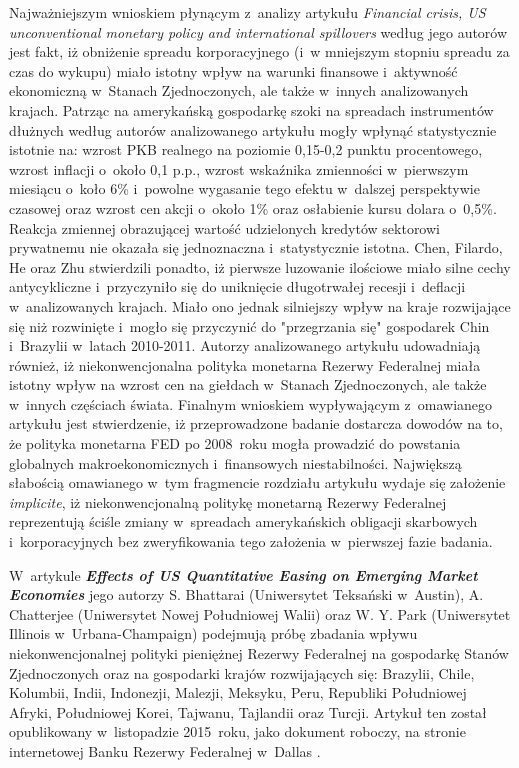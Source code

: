 Najważniejszym wnioskiem płynącym z~analizy artykułu \textit{Financial crisis, US unconventional monetary policy and international spillovers} według jego autorów jest fakt, iż obniżenie spreadu korporacyjnego (i~w mniejszym stopniu spreadu za czas do wykupu) miało istotny wpływ na warunki finansowe i~aktywność ekonomiczną w~Stanach Zjednoczonych, ale także w~innych analizowanych krajach. Patrząc na amerykańską gospodarkę szoki na spreadach instrumentów dłużnych według autorów analizowanego artykułu mogły wpłynąć statystycznie istotnie na: wzrost PKB realnego na poziomie 0,15-0,2 punktu procentowego, wzrost inflacji o~około 0,1 p.p., wzrost wskaźnika zmienności w~pierwszym miesiącu o~koło 6\% i~powolne wygasanie tego efektu w~dalszej perspektywie czasowej oraz wzrost cen akcji o~około 1\% oraz osłabienie kursu dolara o~0,5\%. Reakcja zmiennej obrazującej wartość udzielonych kredytów sektorowi prywatnemu nie okazała się jednoznaczna i~statystycznie istotna. Chen, Filardo, He oraz Zhu stwierdzili ponadto, iż pierwsze luzowanie ilościowe miało silne cechy antycykliczne i~przyczyniło się do uniknięcie długotrwałej recesji i~deflacji w~analizowanych krajach. Miało ono jednak silniejszy wpływ na kraje rozwijające się niż rozwinięte i~mogło się przyczynić do "przegrzania się" gospodarek Chin i~Brazylii w~latach 2010-2011. Autorzy analizowanego artykułu udowadniają również, iż niekonwencjonalna polityka monetarna Rezerwy Federalnej miała istotny wpływ na wzrost cen na giełdach w~Stanach Zjednoczonych, ale także w~innych częściach świata. Finalnym wnioskiem wypływającym z~omawianego artykułu jest stwierdzenie, iż przeprowadzone badanie dostarcza dowodów na to, że polityka monetarna \acs{FED} po 2008~roku mogła prowadzić do powstania globalnych makroekonomicznych i~finansowych niestabilności. Największą słabością omawianego w~tym fragmencie rozdziału artykułu wydaje się założenie \textit{implicite}, iż niekonwencjonalną politykę monetarną Rezerwy Federalnej reprezentują ściśle zmiany w~spreadach amerykańskich obligacji skarbowych i~korporacyjnych bez  zweryfikowania tego założenia w~pierwszej fazie badania. 

W~artykule \textbf{\textit{Effects of US Quantitative Easing on Emerging Market Economies}} jego autorzy S. Bhattarai (Uniwersytet Teksański w~Austin), A. Chatterjee (Uniwersytet Nowej Południowej Walii) oraz W. Y. Park (Uniwersytet Illinois w~Urbana-Champaign) podejmują próbę zbadania wpływu niekonwencjonalnej polityki pieniężnej Rezerwy Federalnej na gospodarkę Stanów Zjednoczonych oraz na gospodarki krajów rozwijających się: Brazylii, Chile, Kolumbii, Indii, Indonezji, Malezji, Meksyku, Peru, Republiki Południowej Afryki, Południowej Korei, Tajwanu, Tajlandii oraz Turcji. Artykuł ten został opublikowany w~listopadzie 2015~roku, jako dokument roboczy, na stronie internetowej Banku Rezerwy Federalnej w~Dallas \cite{bhattarai36}.

